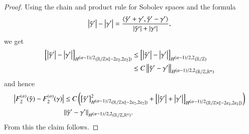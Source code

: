 \begin{proof}
 Using the chain and product rule for Sobolev spaces and the formula
 \[
  \abs\dgt-\abs\dg 
  = \frac{\sp{\dgt+\dg,\dgt-\dg}}{\abs\dgt+\abs\dg},
 \]
 we get
 \begin{align*}
  \seminorm{\abs\dgt-\abs\dg}_{\W[(\a-1)/2](\R/\Z\times[-2\eps_2,2\eps_2])} 
  & \le \seminorm{\abs\dgt-\abs\dg}_{\W[(\a-1)/2,2](\R/\Z)} \\
  &  \le C \norm{\dgt-\dg}_{\W[(\a-1)/2,2](\R/\Z,\R^n)}
  \end{align*}
 and hence
 \begin{align*}
    \abs{F_2^{(\alpha)}(\gt)-F_2^{(\alpha)}(\g)}
   &\le C \left(\seminorm{\dgt}_{\W[(\a-1)/2](\R/\Z\times[-2\eps_2,2\eps_2])}^2 +
    \seminorm{\abs\dgt+\abs\dg}_{\W[(\a-1)/2](\R/\Z\times[-2\eps_2,2\eps_2])} \right)
   \\
    &\|\dgt-\dg\|_{\W[(\a-1)/2,2](\R/\Z,\R^n)}.
 \end{align*}
 From this the claim follows.
\end{proof}

